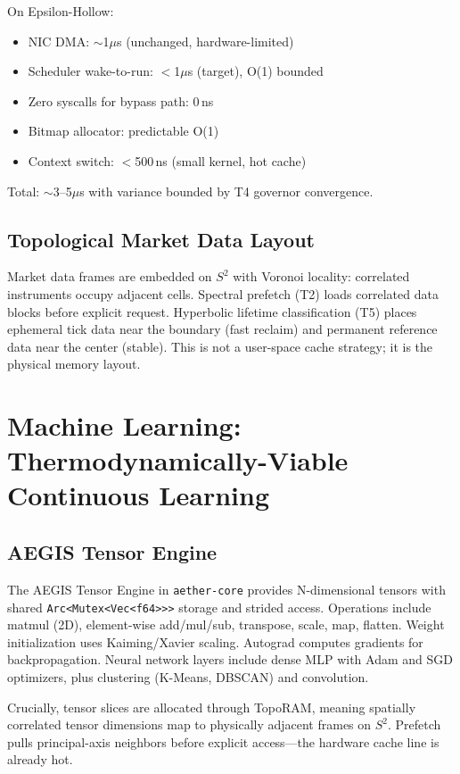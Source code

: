 \documentclass[11pt, a4paper]{article}
\theoremstyle{proofform}
\numberwithin{innerpoints}{subsection}
\numberwithin{disproof}{subsection}
\theoremstyle{mathproof}
\begin{document}
On Epsilon-Hollow:
\begin{itemize}[nosep]
  \item NIC DMA: $\sim$1$\mu$s (unchanged, hardware-limited)
  \item Scheduler wake-to-run: $<$1$\mu$s (target), O(1) bounded
  \item Zero syscalls for bypass path: 0\,ns
  \item Bitmap allocator: predictable O(1)
  \item Context switch: $<$500\,ns (small kernel, hot cache)
\end{itemize}
Total: $\sim$3--5$\mu$s with variance bounded by T4 governor convergence.

\subsection{Topological Market Data Layout}

Market data frames are embedded on $S^2$ with Voronoi locality: correlated instruments occupy adjacent cells. Spectral prefetch (T2) loads correlated data blocks before explicit request. Hyperbolic lifetime classification (T5) places ephemeral tick data near the boundary (fast reclaim) and permanent reference data near the center (stable). This is not a user-space cache strategy; it is the physical memory layout.

\section{Machine Learning: Thermodynamically-Viable Continuous Learning}
\label{sec:ml}

\subsection{AEGIS Tensor Engine}

The AEGIS Tensor Engine in \texttt{aether-core} provides N-dimensional tensors with shared \texttt{Arc<Mutex<Vec<f64>>>} storage and strided access. Operations include matmul (2D), element-wise add/mul/sub, transpose, scale, map, flatten. Weight initialization uses Kaiming/Xavier scaling. Autograd computes gradients for backpropagation. Neural network layers include dense MLP with Adam and SGD optimizers, plus clustering (K-Means, DBSCAN) and convolution.

Crucially, tensor slices are allocated through TopoRAM, meaning spatially correlated tensor dimensions map to physically adjacent frames on $S^2$. Prefetch pulls principal-axis neighbors before explicit access---the hardware cache line is already hot.
\end{document}
